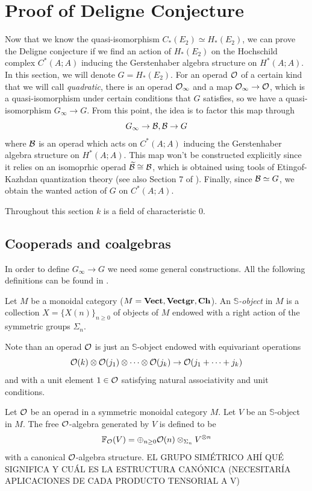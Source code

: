 \documentclass[TFM.tex]{subfiles}
\begin{document}
\chapter{Proof of Deligne Conjecture}

Now that we know the quasi-isomorphism $C_*(E_2)\simeq H_*(E_2)$, we can prove the Deligne conjecture if we find an action of $H_*(E_2)$ on the Hochschild complex $C^*(A;A)$ inducing the Gerstenhaber algebra structure on $H^*(A;A)$. In this section, we will denote $G=H_*(E_2)$. For an operad ${\mathcal O}$ of a certain kind that we will call \emph{quadratic}, there is an operad ${\mathcal O}_\infty$ and a map ${\mathcal O}_\infty\to{\mathcal O}$, which is a quasi-isomorphism under certain conditions that $G$ satisfies, so we have a quasi-isomorphism $G_\infty\to G$. From this point, the idea is to factor this map through
\[
G_\infty\to \mathcal{B},\mathcal{B}\to G
\]
where $\mathcal{B}$ is an operad which acts on $C^*(A;A)$ inducing the Gerstenhaber algebra structure on $H^*(A;A)$.  This map won't be constructed explicitly since it relies on an isomoprhic operad $\widetilde{\mathcal{B}}\cong\mathcal{B}$, which is obtained using tools of Etingof-Kazhdan quantization theory \cite{EK} (see also Section 7 of \cite{Hinich}). Finally, since $\mathcal{B}\simeq G$, we obtain the wanted action of $G$ on $C^*(A;A)$. 

Throughout this section $k$ is a field of characteristic 0. 


\section{Cooperads and coalgebras}

In order to define $G_\infty\to G$ we need some general constructions. All the following definitions can be found in \cite{Hinich}.

\begin{defi}
Let $M$ be a monoidal category ($M=\mathrm{\mathbf{Vect}}, \mathrm{\mathbf{Vectgr}},\mathrm{\mathbf{Ch}}$). An \emph{$\mathbb{S}$-object} in $M$ is a collection $X=\{X(n)\}_{n\geq 0}$ of objects of $M$ endowed with a right action of the symmetric groups $\Sigma_n$.
\end{defi}

Note than an operad ${\mathcal O}$ is just an $\mathbb{S}$-object endowed with
equivariant operations
\[{\mathcal O}(k)\otimes{\mathcal O}(j_1)\otimes\cdots\otimes{\mathcal O}(j_k)\to {\mathcal O}(j_1+\cdots+j_k)\]
and with a unit element $1 \in{\mathcal O}$ satisfying natural associativity and unit conditions.


\begin{defi}
Let ${\mathcal O}$ be an operad in a symmetric monoidal category $M$. Let $V$ be an $\mathbb{S}$-object in $M$. The free ${\mathcal O}$-algebra generated by $V$ is defined to be
\[
\mathbb{F}_{\mathcal O}(V)=\oplus_{n\geq 0}{\mathcal O}(n)\otimes_{\Sigma_n}V^{\otimes n}
\]
with a canonical ${\mathcal O}$-algebra structure. EL GRUPO SIMÉTRICO AHÍ QUÉ SIGNIFICA Y CUÁL ES LA ESTRUCTURA CANÓNICA (NECESITARÍA APLICACIONES DE CADA PRODUCTO TENSORIAL A V)
\end{defi}
\end{document}
